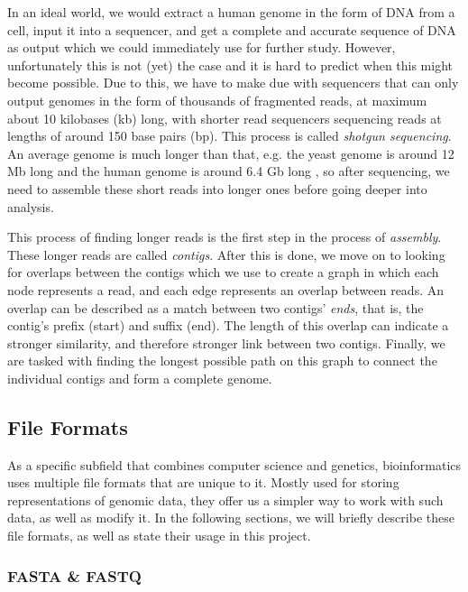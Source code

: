 \documentclass[times, utf8, diplomski, english]{fer_eng}
\begin{document}
In an ideal world, we would extract a human genome in the form of DNA from a cell, input it into a sequencer, and get a complete and accurate sequence of DNA as output which we could immediately use for further study. However, unfortunately this is not (yet) the case and it is hard to predict when this might become possible. Due to this, we have to make due with sequencers that can only output genomes in the form of thousands of fragmented reads, at maximum about 10 kilobases (kb) long, with shorter read sequencers sequencing reads at lengths of around 150 base pairs (bp). This process is called \textit{shotgun sequencing}. An average genome is much longer than that, e.g. the yeast genome is around 12 Mb long \cite{yeast} and the human genome is around 6.4 Gb long \cite{human}, so after sequencing, we need to assemble these short reads into longer ones before going deeper into analysis.

This process of finding longer reads is the first step in the process of \textit{assembly}. These longer reads are called \textit{contigs}. After this is done, we move on to looking for overlaps between the contigs which we use to create a graph in which each node represents a read, and each edge represents an overlap between reads. An overlap can be described as a match between two contigs' \textit{ends}, that is, the contig's prefix (start) and suffix (end). The length of this overlap can indicate a stronger similarity, and therefore stronger link between two contigs. Finally, we are tasked with finding the longest possible path on this graph to connect the individual contigs and form a complete genome.


\subsection{File Formats}

As a specific subfield that combines computer science and genetics, bioinformatics uses multiple file formats that are unique to it. Mostly used for storing representations of genomic data, they offer us a simpler way to work with such data, as well as modify it. In the following sections, we will briefly describe these file formats, as well as state their usage in this project.

\subsubsection{FASTA \& FASTQ}
\end{document}
